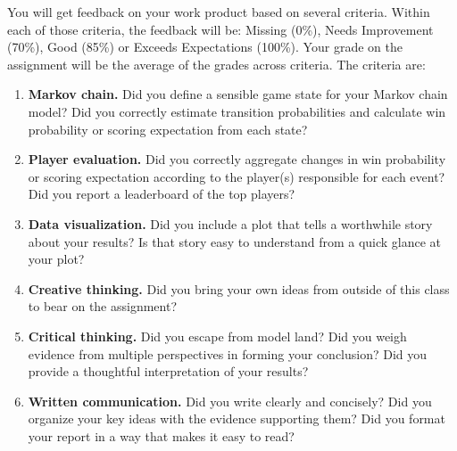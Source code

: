 \documentclass{article}
\begin{document}
      You will get feedback on your work product based on several criteria. Within each of those criteria, the feedback will be: Missing (0\%), Needs Improvement (70\%), Good (85\%) or Exceeds Expectations (100\%). Your grade on the assignment will be the average of the grades across criteria. The criteria are:
      \begin{enumerate}
        \item {\bf Markov chain.} Did you define a sensible game state for your Markov chain model? Did you correctly estimate transition probabilities and calculate win probability or scoring expectation from each state?
        \item {\bf Player evaluation.} Did you correctly aggregate changes in win probability or scoring expectation according to the player(s) responsible for each event? Did you report a leaderboard of the top players?
        \item {\bf Data visualization.} Did you include a plot that tells a worthwhile story about your results? Is that story easy to understand from a quick glance at your plot?
        \item {\bf Creative thinking.} Did you bring your own ideas from outside of this class to bear on the assignment?
        \item {\bf Critical thinking.} Did you escape from model land? Did you weigh evidence from multiple perspectives in forming your conclusion? Did you provide a thoughtful interpretation of your results?
        \item {\bf Written communication.} Did you write clearly and concisely? Did you organize your key ideas with the evidence supporting them? Did you format your report in a way that makes it easy to read?
      \end{enumerate}
\end{document}
